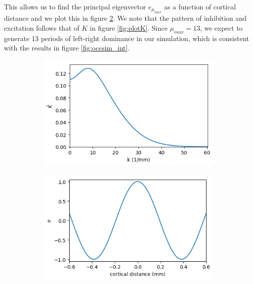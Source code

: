 \documentclass{article}
\begin{document}
This allows us to find the principal eigenvector $e_{\mu_{max}}$ as a function of cortical distance and we plot this in figure \ref{fig:eigvec}. We note that the pattern of inhibition and excitation follows that of $K$ in figure \ref{fig:plotK}.
Since $\mu_{max}=13$, we expect to generate 13 periods of left-right dominance in our simulation, which is consistent with the results in figure \ref{fig:occsim_int}. 

\begin{figure}[h]
	\centering
	\begin{subfigure}[t]{0.35\linewidth}
		\centering
		\includegraphics[width = 1.0\linewidth, trim={5 5 7 9}, clip=true]{figures/plot_Ktilde.png}
		\label{fig:Ktilde}	
	\end{subfigure}%
	\hspace{0.1\linewidth}
	\begin{subfigure}[t]{0.35\linewidth}
		\centering
		\includegraphics[width = 1.0\linewidth, trim={5 5 7 9}, clip=true]{figures/plot_eigvec.png}
		\label{fig:eigvec}	
	\end{subfigure}%
\caption{}
\label{}
\end{figure}
\end{document}
